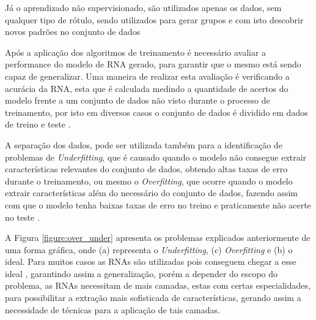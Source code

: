 \par Já o aprendizado não supervisionado, são utilizados apenas os dados, sem qualquer tipo de rótulo, sendo utilizados para gerar grupos \cite{Camila2017} e com isto descobrir novos padrões no conjunto de dados \cite{murphy2012}

\par Após a aplicação dos algoritmos de treinamento é necessário avaliar a performance do modelo de RNA gerado, para garantir que o mesmo está sendo capaz de generalizar. Uma maneira de realizar esta avaliação é verificando a acurácia da RNA, esta que é calculada medindo a quantidade de acertos do modelo frente a um conjunto de dados não visto durante o processo de treinamento, por isto em diversos casos o conjunto de dados é dividido em dados de treino e teste \cite{Goodfellow-et-al-2016}.

\par A separação dos dados, pode ser utilizada também para a identificação de problemas de \textit{Underfitting}, que é causado quando o modelo não consegue extrair características relevantes do conjunto de dados, obtendo altas taxas de erro durante o treinamento, ou mesmo o \textit{Overfitting}, que ocorre quando o modelo extrair características além do necessário do conjunto de dados, fazendo assim com que o modelo tenha baixas taxas de erro no treino e praticamente não acerte no teste \cite{Goodfellow-et-al-2016}.


\par A Figura \ref{figure:over_under} apresenta os problemas explicados anteriormente de uma forma gráfica, onde (a) representa o \textit{Underfitting}, (c) \textit{Overfitting} e (b) o ideal. Para muitos casos as RNAs são utilizadas pois conseguem chegar a esse ideal \cite{Goodfellow-et-al-2016}, garantindo assim a generalização, porém a depender do escopo do problema, as RNAs necessitam de mais camadas, estas com certas especialidades, para possibilitar a extração mais sofisticada de características, gerando assim a necessidade de técnicas para a aplicação de tais camadas.


